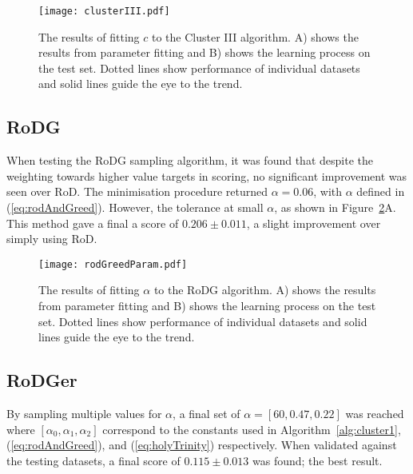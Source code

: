 \begin{figure}[H]
    \begin{center}
        \texttt{[image: clusterIII.pdf]}
        \caption[Cluster III]{The results of fitting $c$ to the Cluster III algorithm. A) shows the results from parameter fitting and B) shows the learning process on the test set. Dotted lines show performance of individual datasets and solid lines guide the eye to the trend.}
        \label{fig:clusterTest}
    \end{center}
\end{figure}

\subsection[Region of Disagreement with Greed]{RoDG}
When testing the RoDG sampling algorithm, it was found that despite the weighting towards higher value targets in scoring, no significant improvement was seen over RoD. The minimisation procedure returned ${\alpha{}=0.06}$, with $\alpha$ defined in (\ref{eq:rodAndGreed}). However, the tolerance at small $\alpha$, as shown in Figure~\ref{fig:rogreed}A. This method gave a final a score of ${0.206\pm{}0.011}$, a slight improvement over simply using RoD.

\begin{figure}[H]
    \begin{center}
        \texttt{[image: rodGreedParam.pdf]}
        \caption[RoD with Greed]{The results of fitting $\alpha{}$ to the RoDG algorithm. A) shows the results from parameter fitting and B) shows the learning process on the test set. Dotted lines show performance of individual datasets and solid lines guide the eye to the trend.}
        \label{fig:rogreed}
    \end{center}
\end{figure}

\subsection[Region of Disagreement with Greed and Clusters]{RoDGer}
By sampling multiple values for $\alpha$, a final set of $\alpha=[60, 0.47, 0.22]$ was reached where $[\alpha{}_0, \alpha{}_1, \alpha{}_2]$ correspond to the constants used in Algorithm~\ref{alg:cluster1}, (\ref{eq:rodAndGreed}), and (\ref{eq:holyTrinity}) respectively. When validated against the testing datasets, a final score of $0.115\pm{}0.013$ was found; the best result.

